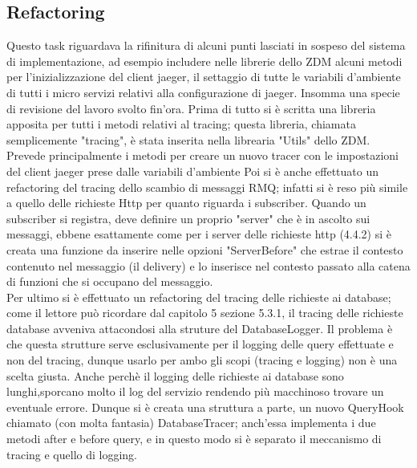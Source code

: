 \documentclass[a4paper,12pt,titlepage,italian,openany]{report}
\begin{document}
\subsection{Refactoring}
Questo task riguardava la rifinitura di alcuni punti lasciati in sospeso del sistema di implementazione, ad esempio includere nelle librerie dello ZDM\cite{zdm:1} alcuni metodi per l'inizializzazione del client jaeger, il settaggio di tutte le variabili d'ambiente di tutti i micro servizi relativi alla configurazione di jaeger.
Insomma una specie di revisione del lavoro svolto fin'ora.
Prima di tutto si è scritta una libreria apposita per tutti i metodi relativi al tracing; questa libreria, chiamata semplicemente "tracing", 
è stata inserita nella librearia "Utils" dello ZDM\cite{zdm:1}.
Prevede principalmente i metodi per creare un nuovo tracer con le impostazioni del client jaeger prese dalle variabili d'ambiente
Poi si è anche effettuato un refactoring del tracing dello scambio di messaggi RMQ; infatti si è reso più simile a quello delle
 richieste Http per quanto riguarda i subscriber. Quando un subscriber si registra, deve definire un proprio "server" che è in ascolto sui messaggi, ebbene esattamente come per i server delle richieste http (4.4.2) si
è creata una funzione da inserire nelle opzioni "ServerBefore" che estrae il contesto contenuto nel messaggio (il delivery)
 e lo inserisce nel contesto passato alla catena di funzioni che si occupano del messaggio.
 \\Per ultimo si è effettuato un refactoring del tracing delle richieste ai database; come il lettore può ricordare dal capitolo 5 sezione 5.3.1, il tracing delle richieste database avveniva attacondosi alla struture del DatabaseLogger. Il problema è che 
 questa strutture serve esclusivamente per il logging delle query effettuate e non del tracing, dunque usarlo per ambo gli scopi (tracing e logging) non è una scelta giusta. Anche perchè il logging delle richieste ai database sono lunghi,sporcano molto il log del servizio rendendo più macchinoso trovare un eventuale errore.
 Dunque si è creata una struttura a parte, un nuovo QueryHook chiamato (con molta fantasia) DatabaseTracer; anch'essa implementa i due metodi after e before query, e in questo modo si è separato il meccanismo di tracing e quello di logging.
\end{document}
